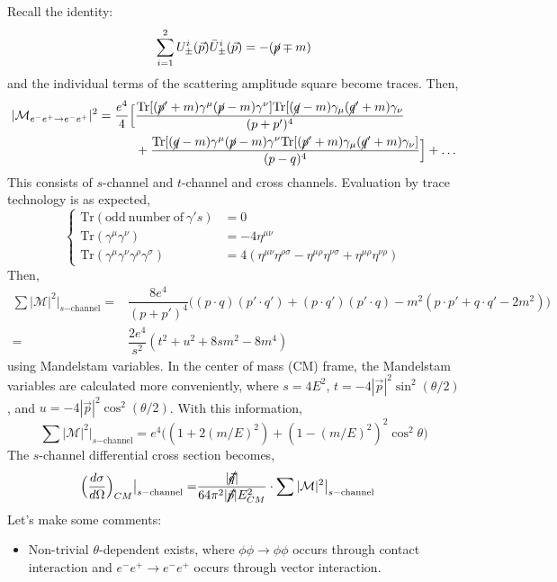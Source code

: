 \begin{ex}
Recall the identity:
\[\sum ^{2}_{i=1}U^{i}_{\pm}(\vec{p})\bar{U}^{i}_{\pm}(\vec{p})=-(\cancel{p}\mp m)\]
and the individual terms of the scattering amplitude square become traces. Then,
\[\begin{align*}
|\mathcal{M}_{e^{-}e^{+}\rightarrow e^{-}e^{+}}|^2=\dfrac{e^{4}}{4}\Big[&\dfrac{\mathrm{Tr}[(\cancel{p}'+m)\gamma ^{\mu }(\cancel{p}-m)\gamma ^{\nu }]\mathrm{Tr}[(\cancel{q}-m)\gamma _{\mu }(\cancel{q}'+m)\gamma _{\nu }}{(p+p')^{4}}\\&+\dfrac{\mathrm{Tr}[(\cancel{q}-m)\gamma ^{\mu }(\cancel{p}-m)\gamma ^{\nu }\mathrm{Tr}[(\cancel{p}'+m)\gamma _{\mu }(\cancel{q}'+m)\gamma _\nu ]}{(p-q)^{4}}\Big]+\ldots 
\end{align*}\]
This consists of $s$-channel and $t$-channel and cross channels. Evaluation by trace technology is as expected,
\[\begin{cases}
\mathrm{Tr}(\mathrm{odd\ number\ of\ }\gamma 's)&=0\\
\mathrm{Tr}(\gamma^{\mu }\gamma ^{\nu })&=-4\eta ^{\mu \nu }\\
\mathrm{Tr}(\gamma ^{\mu }\gamma ^{\nu }\gamma ^{\rho }\gamma ^{\sigma })&=4(\eta ^{\mu \nu }\eta ^{\rho \sigma }-\eta ^{\mu \rho }\eta ^{\nu \sigma }+\eta ^{\mu \rho }\eta ^{\nu \rho })
\end{cases}\]
Then,
\[\begin{align*}
\sum |\mathcal{M}|^2\big|_{s\mathrm{-channel}}=&\dfrac{8e^{4}}{(p+p')^{4}}\Big((p\cdot q)(p'\cdot q')+(p\cdot q')(p'\cdot q)-m^2(p\cdot p'+q\cdot q'-2m^2)\Big)\\
=&\dfrac{2e^{4}}{s^2}(t^2+u^2+8sm^2-8m^{4})
\end{align*}\]
using Mandelstam variables. In the center of mass (CM) frame, the Mandelstam variables are calculated more conveniently, where $s=4E^2$, $t=-4|\vec{p}|^2\sin ^2(\theta /2)$, and $u=-4|\vec{p}|^2\cos ^2(\theta /2)$. With this information,
\[\sum |\mathcal{M}|^2\big|_{s\mathrm{-channel}}=e^{4}\Big((1+2(m/E)^2)+(1-(m/E)^2)^2\cos ^2\theta \Big)\]
The $s$-channel differential cross section becomes,
\[\begin{align*}
\Big(\dfrac{d \sigma }{d \mathrm{\Omega} } \Big)_{CM}\big|_{s\mathrm{-channel}}=&\dfrac{|\cancel{\vec{q}}|}{64\pi ^2|\cancel{\vec{p}}|E_{CM}^2}\cdot \sum |\mathcal{M}|^2\big|_{s \mathrm{-channel}}
\end{align*}\]
Let's make some comments:
\begin{itemize}
\item[(i)] Non-trivial $\theta $-dependent exists, where $\phi \phi \rightarrow \phi \phi $ occurs through contact interaction and $e^{-}e^{+}\rightarrow e^{-}e^{+}$ occurs through vector interaction.
\end{itemize}
\end{ex}
\vspace{2ex}

